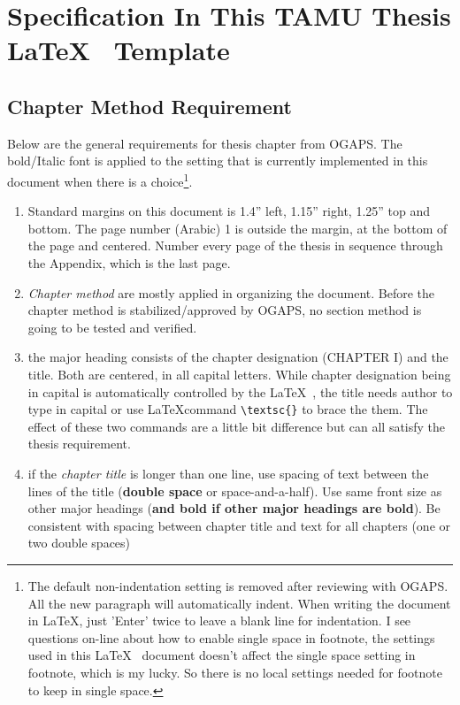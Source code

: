 \section{Specification In This TAMU Thesis \LaTeX  ~ Template}

\subsection{Chapter Method Requirement}

Below are the general requirements for thesis chapter from OGAPS. The bold/Italic font is applied to the setting that is currently implemented in this document when there is a choice\footnote{The default non-indentation setting is removed after reviewing with OGAPS. All the new paragraph will automatically indent. When writing the document in \LaTeX, just 'Enter' twice to leave a blank line for indentation. I see questions on-line about how to enable single space in footnote, the settings used in this \LaTeX~ document doesn't affect the single space setting in footnote, which is my lucky. So there is no local settings needed for footnote to keep in single space.}.

\begin{enumerate}
\item	Standard margins on this document is 1.4'' left, 1.15'' right, 1.25'' top and bottom. The page number (Arabic) 1 is outside the margin, at the bottom of the page and centered. Number every page of the thesis in sequence through the Appendix, which is the last page.

\item \textit{Chapter method} are mostly applied in organizing the document. Before the chapter method is stabilized/approved by OGAPS, no section method is going to be tested and verified.

\item the major heading consists of the chapter designation (CHAPTER I) and the title. Both are centered, in all capital letters. While chapter designation being in capital is automatically controlled by the \LaTeX ~, the title needs author to type in capital or use \LaTeX command \verb|\textsc{}| to brace the them. The effect of these two commands are a little bit difference but can all satisfy the thesis requirement.

\item if the \textit{chapter title} is longer than one line, use spacing of text between the lines of the title (\textbf{double space} or space-and-a-half). Use same front size as other major headings (\textbf{and bold if other major headings are bold}). Be consistent with spacing between chapter title and text for all chapters (one or two double spaces)
\end{enumerate}


